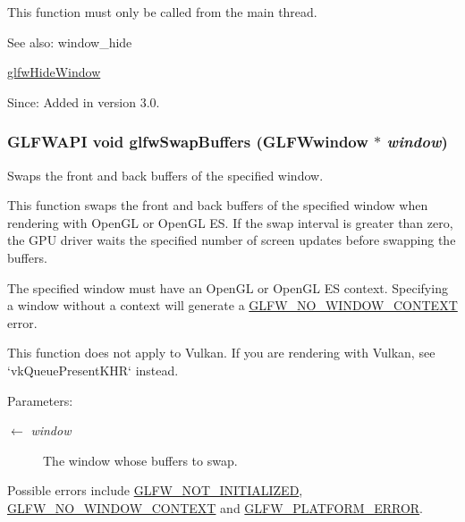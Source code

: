 This function must only be called from the main thread.

\begin{Desc}
\item[See also:]window\_\-hide 

\hyperlink{group__window_ga17e287d521544bdeceafa09ac036e20}{glfwHideWindow}\end{Desc}
\begin{Desc}
\item[Since:]Added in version 3.0. \end{Desc}
\hypertarget{group__window_gfb827800eedbfcbc97b1e5408df668d7}{
\subsubsection[glfwSwapBuffers]{\setlength{\rightskip}{0pt plus 5cm}GLFWAPI void glfwSwapBuffers ({\bf GLFWwindow} $\ast$ {\em window})}}
\label{group__window_gfb827800eedbfcbc97b1e5408df668d7}


Swaps the front and back buffers of the specified window. 

This function swaps the front and back buffers of the specified window when rendering with OpenGL or OpenGL ES. If the swap interval is greater than zero, the GPU driver waits the specified number of screen updates before swapping the buffers.

The specified window must have an OpenGL or OpenGL ES context. Specifying a window without a context will generate a \hyperlink{group__errors_gcff24d2757da752ae4c80bf452356487}{GLFW\_\-NO\_\-WINDOW\_\-CONTEXT} error.

This function does not apply to Vulkan. If you are rendering with Vulkan, see `vkQueuePresentKHR` instead.

\begin{Desc}
\item[Parameters:]
\begin{description}
\item[\mbox{$\leftarrow$} {\em window}]The window whose buffers to swap.\end{description}
\end{Desc}
Possible errors include \hyperlink{group__errors_g2374ee02c177f12e1fa76ff3ed15e14a}{GLFW\_\-NOT\_\-INITIALIZED}, \hyperlink{group__errors_gcff24d2757da752ae4c80bf452356487}{GLFW\_\-NO\_\-WINDOW\_\-CONTEXT} and \hyperlink{group__errors_gd44162d78100ea5e87cdd38426b8c7a1}{GLFW\_\-PLATFORM\_\-ERROR}.

